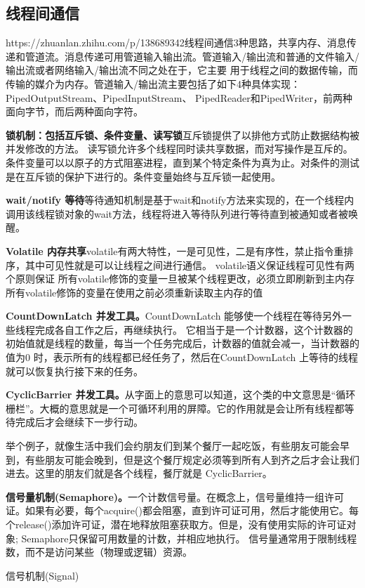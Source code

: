 \documentclass[../../../interview-questions.tex]{subfiles}
\begin{document}
\subsection{线程间通信}

https://zhuanlan.zhihu.com/p/138689342线程间通信3种思路，共享内存、消息传递和管道流。消息传递可用管道输入输出流。管道输入/输出流和普通的文件输入/输出流或者网络输入/输出流不同之处在于，它主要 用于线程之间的数据传输，而传输的媒介为内存。管道输入/输出流主要包括了如下4种具体实现：PipedOutputStream、PipedInputStream、 PipedReader和PipedWriter，前两种面向字节，而后两种面向字符。

\textbf{锁机制：包括互斥锁、条件变量、读写锁}互斥锁提供了以排他方式防止数据结构被并发修改的方法。 读写锁允许多个线程同时读共享数据，而对写操作是互斥的。 条件变量可以以原子的方式阻塞进程，直到某个特定条件为真为止。对条件的测试是在互斥锁的保护下进行的。条件变量始终与互斥锁一起使用。

\textbf{wait/notify 等待}等待通知机制是基于wait和notify方法来实现的，在一个线程内调用该线程锁对象的wait方法，线程将进入等待队列进行等待直到被通知或者被唤醒。

\textbf{Volatile 内存共享}volatile有两大特性，一是可见性，二是有序性，禁止指令重排序，其中可见性就是可以让线程之间进行通信。
volatile语义保证线程可见性有两个原则保证
所有volatile修饰的变量一旦被某个线程更改，必须立即刷新到主内存
所有volatile修饰的变量在使用之前必须重新读取主内存的值

\textbf{CountDownLatch 并发工具。}CountDownLatch 能够使一个线程在等待另外一些线程完成各自工作之后，再继续执行。 它相当于是一个计数器，这个计数器的初始值就是线程的数量，每当一个任务完成后，计数器的值就会减一，当计数器的值为0 时，表示所有的线程都已经任务了，然后在CountDownLatch 上等待的线程就可以恢复执行接下来的任务。

\textbf{CyclicBarrier 并发工具。}从字面上的意思可以知道，这个类的中文意思是“循环栅栏”。大概的意思就是一个可循环利用的屏障。它的作用就是会让所有线程都等待完成后才会继续下一步行动。

举个例子，就像生活中我们会约朋友们到某个餐厅一起吃饭，有些朋友可能会早到，有些朋友可能会晚到，但是这个餐厅规定必须等到所有人到齐之后才会让我们进去。这里的朋友们就是各个线程，餐厅就是 CyclicBarrier。

\textbf{信号量机制(Semaphore)。}一个计数信号量。在概念上，信号量维持一组许可证。如果有必要，每个acquire()都会阻塞，直到许可证可用，然后才能使用它。每个release()添加许可证，潜在地释放阻塞获取方。但是，没有使用实际的许可证对象; Semaphore只保留可用数量的计数，并相应地执行。
信号量通常用于限制线程数，而不是访问某些（物理或逻辑）资源。

信号机制(Signal)
\end{document}
